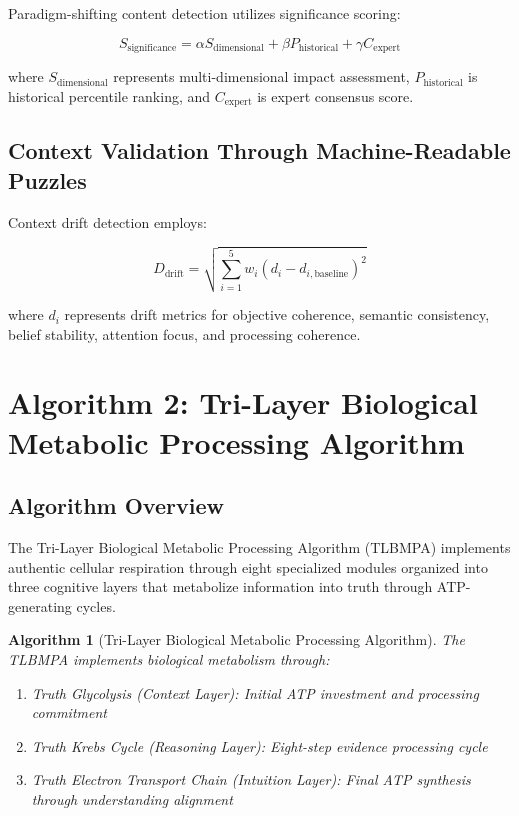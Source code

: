 \documentclass[12pt,a4paper]{article}
\newtheorem{algorithm_def}[theorem]{Algorithm}
\begin{document}
Paradigm-shifting content detection utilizes significance scoring:

\begin{equation}
S_{\text{significance}} = \alpha S_{\text{dimensional}} + \beta P_{\text{historical}} + \gamma C_{\text{expert}}
\end{equation}

where $S_{\text{dimensional}}$ represents multi-dimensional impact assessment, $P_{\text{historical}}$ is historical percentile ranking, and $C_{\text{expert}}$ is expert consensus score.

\subsection{Context Validation Through Machine-Readable Puzzles}

Context drift detection employs:

\begin{equation}
D_{\text{drift}} = \sqrt{\sum_{i=1}^{5} w_i (d_i - d_{i,\text{baseline}})^2}
\end{equation}

where $d_i$ represents drift metrics for objective coherence, semantic consistency, belief stability, attention focus, and processing coherence.

\section{Algorithm 2: Tri-Layer Biological Metabolic Processing Algorithm}

\subsection{Algorithm Overview}

The Tri-Layer Biological Metabolic Processing Algorithm (TLBMPA) implements authentic cellular respiration through eight specialized modules organized into three cognitive layers that metabolize information into truth through ATP-generating cycles.

\begin{algorithm_def}[Tri-Layer Biological Metabolic Processing Algorithm]
\label{alg:tlbmpa}
The TLBMPA implements biological metabolism through:
\begin{enumerate}
    \item Truth Glycolysis (Context Layer): Initial ATP investment and processing commitment
    \item Truth Krebs Cycle (Reasoning Layer): Eight-step evidence processing cycle
    \item Truth Electron Transport Chain (Intuition Layer): Final ATP synthesis through understanding alignment
\end{enumerate}
\end{algorithm_def}
\end{document}
